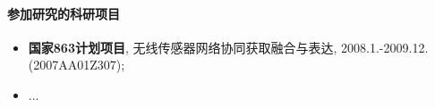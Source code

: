 \paragraph{参加研究的科研项目}

\begin{itemize}
\item 
\textbf{国家863计划项目}, 无线传感器网络协同获取融合与表达, 2008.1.-2009.12. (2007AA01Z307);
\item ...
\end{itemize}

